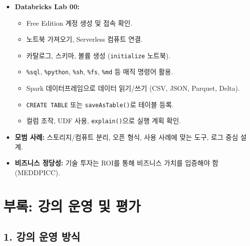\documentclass[11pt,a4paper]{article}
\begin{document}
\begin{itemize}
\begin{tcolorbox}[colback=myblue!20, colframe=blue!50!black, title=\textbf{CSCI103 Lecture 1 핵심 요약}, sharp corners, boxsep=5mm, left=3mm, right=3mm, top=3mm, bottom=3mm]
\begin{itemize}
    \item[] \textbf{Databricks Lab 00:}
    \begin{itemize}
        \item Free Edition 계정 생성 및 접속 확인.
        \item 노트북 가져오기, Serverless 컴퓨트 연결.
        \item 카탈로그, 스키마, 볼륨 생성 (\texttt{initialize} 노트북).
        \item \texttt{\%sql}, \texttt{\%python}, \texttt{\%sh}, \texttt{\%fs}, \texttt{\%md} 등 매직 명령어 활용.
        \item Spark 데이터프레임으로 데이터 읽기/쓰기 (CSV, JSON, Parquet, Delta).
        \item \texttt{CREATE TABLE} 또는 \texttt{saveAsTable()}로 테이블 등록.
        \item 컬럼 조작, UDF 사용, \texttt{explain()}으로 실행 계획 확인.
    \end{itemize}
    \item[] \textbf{모범 사례:} 스토리지/컴퓨트 분리, 오픈 형식, 사용 사례에 맞는 도구, 로그 중심 설계.
    \item[] \textbf{비즈니스 정당성:} 기술 투자는 ROI를 통해 비즈니스 가치를 입증해야 함 (MEDDPICC).
\end{itemize}
\end{tcolorbox}

\newpage

\section*{부록: 강의 운영 및 평가}

\subsection*{1. 강의 운영 방식}


\end{itemize}
\end{document}

